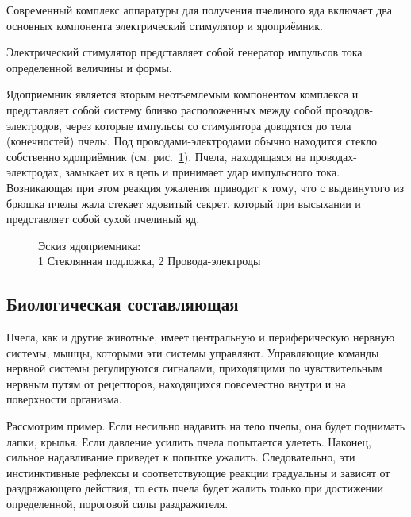 Современный комплекс аппаратуры для получения пчелиного яда включает два основных компонента \longndash электрический стимулятор и ядоприёмник.

Электрический стимулятор представляет собой генератор импульсов тока определенной величины и формы.

Ядоприемник является вторым неотъемлемым компонентом комплекса и представляет собой систему близко расположенных между собой проводов-электродов, через которые импульсы со стимулятора доводятся до тела (конечностей) пчелы. Под проводами-электродами обычно находится стекло \longndash собственно ядоприёмник (см. рис.~\ref{img:poison_reciever}). Пчела, находящаяся на проводах-электродах, замыкает их в цепь и принимает удар импульсного тока. Возникающая при этом реакция ужаления приводит к тому, что с выдвинутого из брюшка пчелы жала стекает ядовитый секрет, который при высыхании и представляет собой сухой пчелиный яд.

\begin{figure}[]
  
  \caption{Эскиз ядоприемника: \\
  	1 \longndash Стеклянная подложка,
  	2 \longndash Провода-электроды
  }
  \label{img:poison_reciever}
\end{figure}

\subsection*{Биологическая составляющая}

Пчела, как и другие животные, имеет центральную и периферическую нервную системы, мышцы, которыми эти системы управляют. Управляющие команды нервной системы регулируются сигналами, приходящими по чувствительным нервным путям от рецепторов, находящихся повсеместно \longndash внутри и на поверхности организма.

Рассмотрим пример. Если несильно надавить на тело пчелы, она будет поднимать лапки, крылья. Если давление усилить \longndash пчела попытается улететь. Наконец, сильное надавливание приведет к попытке ужалить. Следовательно, эти инстинктивные рефлексы и соответствующие реакции градуальны и зависят от раздражающего действия, то есть пчела будет жалить только при достижении определенной, пороговой силы раздражителя.

